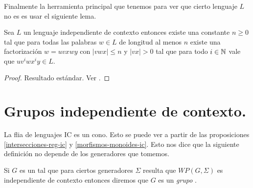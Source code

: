 \documentclass[tesis.tex]{subfiles}
\begin{document}
Finalmente la herramienta principal que tenemos para ver que cierto lenguaje $L$ no es \ic es usar el siguiente lema.

\begin{lema}[Pumping] \label{pumping}
	Sea $L$ un lenguaje independiente de contexto entonces existe una constante $n \ge 0$ tal que para todas las palabras $w \in L$ de longitud al menos $n$ existe una factorización $w = uvxwy$ con $|vwx| \le n$ y $|vx| > 0$ tal que para todo $i \in \mathbb{N}$ vale que $uv^iwx^iy \in L$.
\end{lema}

\begin{proof}
	Resultado estándar. Ver \cite{hopcraft-ullman}.
\end{proof}

\section{Grupos independiente de contexto.}

La flia de lenguajes $\text{IC}$ es un cono.
Esto se puede ver a partir de las proposiciones  \ref{intersecciones-reg-ic} y \ref{morfismos-monoides-ic}.
Esto nos dice que la siguiente definición no depende de los generadores que tomemos.

\begin{deff}
	Si $G$ es un \fg tal que para ciertos generadores $\Sigma$ resulta que $WP(G, \Sigma)$ es independiente de contexto entonces diremos que $G$ es un \emph{grupo \ic }.
\end{deff}
\end{document}
